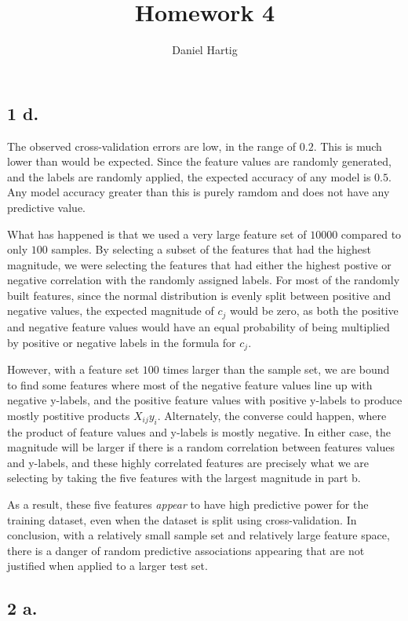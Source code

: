 \documentclass{article}
\title{Homework 4}
\author{Daniel Hartig}
\begin{document}
\maketitle

\subsection*{1 d.}

The observed cross-validation errors are low, in the range of $0.2$. This is much lower than would be expected. Since the feature values are randomly generated, and the labels are randomly applied, the expected accuracy of any model is $0.5$. Any model accuracy greater than this is purely ramdom and does not have any predictive value. 

What has happened is that we used a very large feature set of $10000$ compared to only $100$ samples. By selecting a subset of the features that had the highest magnitude, we were selecting the features that had either the highest postive or negative correlation with the randomly assigned labels. For most of the randomly built features, since the normal distribution is evenly split between positive and negative values, the expected magnitude of $c_j$ would be zero, as both the positive and negative feature values would have an equal probability of being multiplied by positive or negative labels in the formula for $c_j$. 

However, with a feature set $100$ times larger than the sample set, we are bound to find some features where most of the negative feature values line up with negative y-labels, and the positive feature values with positive y-labels to produce mostly postitive products $X_{ij}y_{i}$. Alternately, the converse could happen, where the product of feature values and y-labels is mostly negative. In either case, the magnitude will be larger if there is a random correlation between features values and y-labels, and these highly correlated features are precisely what we are selecting by taking the five features with the largest magnitude in part b. 

As a result, these five features \textit{appear} to have high predictive power for the training dataset, even when the dataset is split using cross-validation. In conclusion, with a relatively small sample set and relatively large feature space, there is a danger of random predictive associations appearing that are not justified when applied to a larger test set. 

\subsection*{2 a.}
\end{document}
